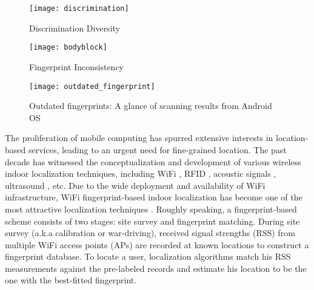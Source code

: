 \documentclass[10pt,conference,compsocconf,letterpaper]{./sty/IEEEtran}
\def\fullfigwidth{1.0\textwidth}
\def\3figwidth{0.3\textwidth}
\begin{document}
\begin{figure*}[t]
	\centering
	\begin{minipage}[t]{\3figwidth}\centering
		\texttt{[image: discrimination]}
  		\caption{Discrimination Diversity}
  		\label{fig:discrimination}
	\end{minipage}
	\hspace{0.2in}
	\begin{minipage}[t]{\3figwidth}\centering
		\centering
  		\texttt{[image: bodyblock]}
  		\caption{Fingerprint Inconsistency}
 		\label{fig:bodyblock}
	\end{minipage}	
	\hspace{0.2in}
	\begin{minipage}[t]{\3figwidth}\centering
		\centering
  		\texttt{[image: outdated\_fingerprint]}
  		\caption{Outdated fingerprints: A glance of scanning results from Android OS}
 		\label{fig:outdated_fingerprint}
	\end{minipage}	
\end{figure*}

The proliferation of mobile computing has spurred extensive interests in location-based services, leading to an urgent need for fine-grained location. The past decade has witnessed the conceptualization and development of various wireless indoor localization techniques, including WiFi \cite{bahl_radar_2000, youssef_horus_2005}, RFID \cite{ni_landmarc_2004, dina_rfid_2013}, acoustic signals \cite{tarzia_indoor_2011, liu2013guoguo}, ultrasound \cite{priyantha_cricket_2000,lazik_indoor_2012}, etc. Due to the wide deployment and availability of WiFi infrastructure, WiFi fingerprint-based indoor localization has become one of the most attractive localization techniques \cite{yang_locating_2012, shen2013walkie, wang_no_2012,liu_push_2012,rai_zee_2012, sen2013avoid}. 
Roughly speaking, a fingerprint-based scheme consists of two stages: site survey and fingerprint matching. During site survey (a.k.a calibration or war-driving), received signal strengths (RSS) from multiple WiFi access points (APs) are recorded at known locations to construct a fingerprint database. To locate a user, localization algorithms match his RSS measurements against the pre-labeled records and estimate his location to be the one with the best-fitted fingerprint.
\end{document}
